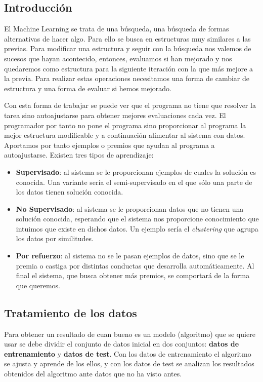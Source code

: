 \subsection{Introducción}

El Machine Learning se trata de una búsqueda, una búsqueda de formas alternativas de hacer algo. Para ello se busca en estructuras muy similares a las previas. Para modificar una estructura y seguir con la búsqueda nos valemos de sucesos que hayan acontecido, entonces, evaluamos si han mejorado y nos quedaremos como estructura para la siguiente iteración con la que más mejore a la previa. Para realizar estas operaciones necesitamos una forma de cambiar de estructura y una forma de evaluar si hemos mejorado.

Con esta forma de trabajar se puede ver que el programa no tiene que resolver la tarea sino autoajustarse para obtener mejores evaluaciones cada vez. El programador por tanto no pone el programa sino proporcionar al programa la mejor estructura modificable y a continuación alimentar al sistema con datos. Aportamos por tanto ejemplos o premios que ayudan al programa a autoajustarse. Existen tres tipos de aprendizaje: 

\begin{itemize}
    \item \textbf{Supervisado}: al sistema se le proporcionan ejemplos de cuales la solución es conocida. Una variante sería el semi-supervisado en el que sólo una parte de los datos tienen solución conocida.
    \item \textbf{No Supervisado}: al sistema se le proporcionan datos que no tienen una solución conocida, esperando que el sistema nos proporcione conocimiento que intuimos que existe en dichos datos. Un ejemplo sería el \textit{clustering} que agrupa los datos por similitudes.
    \item \textbf{Por refuerzo}: al sistema no se le pasan ejemplos de datos, sino que se le premia o castiga por distintas conductas que desarrolla automáticamente. Al final el sistema, que busca obtener más premios, se comportará de la forma que queremos.
\end{itemize}

\subsection{Tratamiento de los datos}

Para obtener un resultado de cuan bueno es un modelo (algoritmo) que se quiere usar se debe dividir el conjunto de datos inicial en dos conjuntos: \textbf{datos de entrenamiento} y \textbf{datos de test}. Con los datos de entrenamiento el algoritmo se ajusta y aprende de los ellos, y con los datos de test se analizan los resultados obtenidos del algoritmo ante datos que no ha visto antes.

